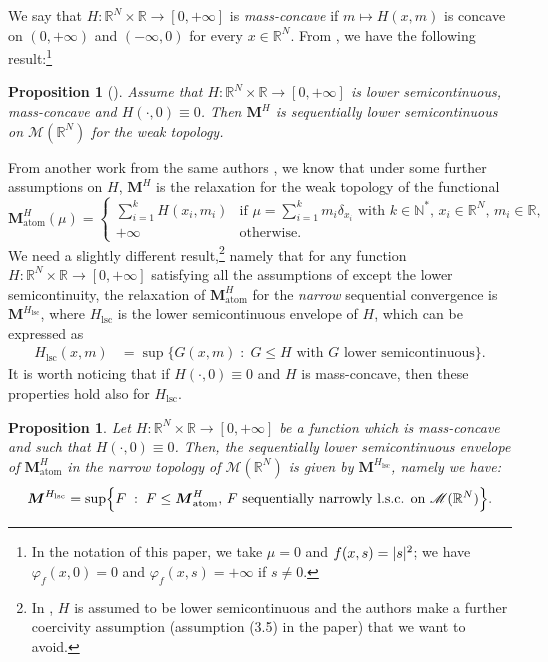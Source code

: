 \documentclass[JEP,XML,SOM,Unicode,published]{cedram}
\theoremstyle{plain}
\newtheorem{proposition}[theorem]{Proposition}
\theoremstyle{definition}
\newcommand{\N}{\mathbb{N}}
\newcommand{\R}{\mathbb{R}}
\newcommand{\Mspace}{\mathscr{M}}
\newcommand{\mass}{\boldsymbol{M}}
\newcommand{\lsc}{\mathrm{lsc}}
\newcommand{\st}{\;:\;}
\DeclarePairedDelimiter{\abs}{\lvert}{\rvert}
\begin{document}
We say that $H : \R^N \times \R \to [0,+\infty]$ is \emph{mass-concave} if $m\mapsto H(x,m)$ is concave on $(0,+\infty)$ and $(-\infty,0)$ for every $x\in\R^N$. From \cite{bouchitteNewLowerSemicontinuity1990}, we have the following result:\footnote{In the notation of this paper, we take \(\mu=0\) and \(f(x,s)=\abs{s}^2\); we have \(\varphi_{f}(x,0)=0\) and \(\varphi_{f}(x,s)=+\infty\) if \(s\neq 0\).}
\begin{proposition}[{\cite[Th.\,3.3]{bouchitteNewLowerSemicontinuity1990}}]\label{lscHmass}
Assume that \(H:\R^N\times\R\to[0,+\infty]\) is lower semicontinuous, mass-concave and $H(\cdot,0) \equiv 0$. Then \(\mass^H\) is sequentially lower semicontinuous on \(\Mspace(\R^N)\) for the weak topology.
\end{proposition}
From another work from the same authors \cite[Th.\,3.2]{bouchitteRelaxationClassNonconvex1993}, we know that under some further assumptions on $H$, \(\mass^H\) is the relaxation for the weak topology of the functional
\[
\mass_\mathrm{atom}^H(\mu)=
\begin{cases}
\sum_{i=1}^k H(x_i,m_i)&\text{if \(\mu=\sum_{i=1}^k m_i\delta_{x_i}\) with $k\in \N^\ast$, $x_i\in\R^N$, \(m_i \in\R\),}\\
+\infty&\text{otherwise.}
\end{cases}
\]
We need a slightly different result,\footnote{In \cite[Th.\,3.2]{bouchitteRelaxationClassNonconvex1993}, $H$ is assumed to be lower semicontinuous and the authors make a further coercivity assumption (assumption (3.5) in the paper) that we want to avoid.} namely that for any function \(H:\R^N\times\R\to[0,+\infty]\) satisfying all the assumptions of  except the lower semicontinuity, the relaxation of \(\mass_\mathrm{atom}^H\) for the \emph{narrow} sequential convergence is \(\mass^{H_\lsc}\), where \(H_\lsc\) is the lower semicontinuous envelope of \(H\), which can be expressed as
\begin{align}\label{semicontinuousEnvelope}
H_\lsc(x,m)&=
\sup\{G(x,m)\st G\leq H\text{ with \(G\) lower semicontinuous}\}.
\end{align}
It is worth noticing that if $H(\cdot,0) \equiv 0$ and $H$ is mass-concave, then these properties hold also for $H_\lsc$.

\begin{proposition}\label{relaxationMass}
Let \(H:\R^N\times\R\to[0,+\infty]\) be a function which is mass-concave and such that \(H(\cdot,0)\equiv 0\). Then, the sequentially lower semicontinuous envelope of \(\mass_\mathrm{atom}^H\) in the narrow topology of \(\Mspace(\R^N)\) is given by \(\mass^{H_\lsc}\), namely we have:
\begin{equation}
\label{relaxationFormula}
\mass^{H_\lsc}=\sup\Bigl\{F\st F\leq \mass_\mathrm{atom}^H\text{, \(F\) sequentially narrowly l.s.c. on \(\Mspace(\R^N)\)}\Bigr\}.
\end{equation}
\end{proposition}
\end{document}
